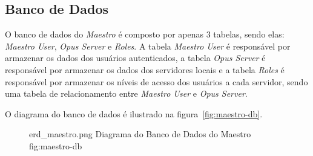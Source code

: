 \subsection{Banco de Dados}
\label{sec:maestro-banco-dados}

O banco de dados do \emph{Maestro} é composto por apenas 3 tabelas, sendo elas: \emph{Maestro User}, \emph{Opus Server} e \emph{Roles}.
A tabela \emph{Maestro User} é responsável por armazenar os dados dos usuários autenticados, a tabela \emph{Opus Server} é responsável por armazenar
os dados dos servidores locais e a tabela \emph{Roles} é responsável por armazenar os níveis de acesso dos usuários a cada servidor, sendo uma 
tabela de relacionamento entre \emph{Maestro User} e \emph{Opus Server}.

O diagrama do banco de dados é ilustrado na figura~\ref{fig:maestro-db}.

\begin{figure}[h!]
    {erd_maestro.png}
    {Diagrama do Banco de Dados do Maestro}
    {fig:maestro-db}
\end{figure}